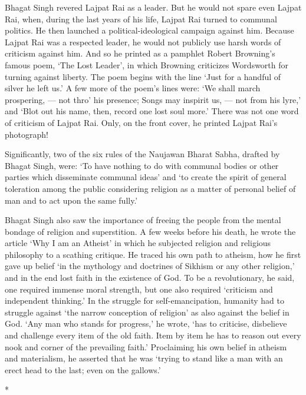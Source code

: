 \begin{multicols}{2}
Bhagat Singh revered Lajpat Rai as a leader. But he would not spare even Lajpat Rai, when, during the last years of his life, Lajpat Rai turned to communal politics. He then launched a political-ideological campaign against him. Because Lajpat Rai was a respected leader, he would not publicly use harsh words of criticism against him. And so he printed as a pamphlet Robert Browning's famous poem, `The Lost Leader', in which Browning criticizes Wordsworth for turning against liberty. The poem begins with the line `Just for a handful of silver he left us.' A few more of the poem's lines were: `We shall march prospering, --- not thro' his presence; Songs may inspirit us, --- not from his lyre,' and `Blot out his name, then, record one lost soul more.' There was not one word of criticism of Lajpat Rai. Only, on the front cover, he printed Lajpat Rai's photograph!

Significantly, two of the six rules of the Naujawan Bharat Sabha, drafted by Bhagat Singh, were: `To have nothing to do with communal bodies or other parties which disseminate communal ideas' and `to create the spirit of general toleration among the public considering religion as a matter of personal belief of man and to act upon the same fully.'

Bhagat Singh also saw the importance of freeing the people from the mental bondage of religion and superstition. A few weeks before his death, he wrote the article `Why I am an Atheist' in which he subjected religion and religious philosophy to a scathing critique. He traced his own path to atheism, how he first gave up belief `in the mythology and doctrines of Sikhism or any other religion,' and in the end lost faith in the existence of God. To be a revolutionary, he said, one required immense moral strength, but one also required `criticism and independent thinking.' In the struggle for self-emancipation, humanity had to struggle against `the narrow conception of religion' as also against the belief in God. `Any man who stands for progress,' he wrote, `has to criticise, disbelieve and challenge every item of the old faith. Item by item he has to reason out every nook and corner of the prevailing faith.' Proclaiming his own belief in atheism and materialism, he asserted that he was `trying to stand like a man with an erect head to the last; even on the gallows.'

\begin{center}*\end{center}


\end{multicols}

